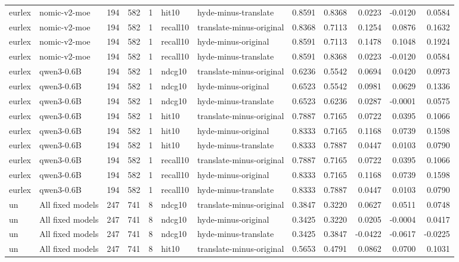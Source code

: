 \begin{tabular}{llrrrllrrrrr}
eurlex & nomic-v2-moe & 194 & 582 & 1 & hit10 & hyde-minus-translate & 0.8591 & 0.8368 & 0.0223 & -0.0120 & 0.0584 \\
eurlex & nomic-v2-moe & 194 & 582 & 1 & recall10 & translate-minus-original & 0.8368 & 0.7113 & 0.1254 & 0.0876 & 0.1632 \\
eurlex & nomic-v2-moe & 194 & 582 & 1 & recall10 & hyde-minus-original & 0.8591 & 0.7113 & 0.1478 & 0.1048 & 0.1924 \\
eurlex & nomic-v2-moe & 194 & 582 & 1 & recall10 & hyde-minus-translate & 0.8591 & 0.8368 & 0.0223 & -0.0120 & 0.0584 \\
eurlex & qwen3-0.6B & 194 & 582 & 1 & ndcg10 & translate-minus-original & 0.6236 & 0.5542 & 0.0694 & 0.0420 & 0.0973 \\
eurlex & qwen3-0.6B & 194 & 582 & 1 & ndcg10 & hyde-minus-original & 0.6523 & 0.5542 & 0.0981 & 0.0629 & 0.1336 \\
eurlex & qwen3-0.6B & 194 & 582 & 1 & ndcg10 & hyde-minus-translate & 0.6523 & 0.6236 & 0.0287 & -0.0001 & 0.0575 \\
eurlex & qwen3-0.6B & 194 & 582 & 1 & hit10 & translate-minus-original & 0.7887 & 0.7165 & 0.0722 & 0.0395 & 0.1066 \\
eurlex & qwen3-0.6B & 194 & 582 & 1 & hit10 & hyde-minus-original & 0.8333 & 0.7165 & 0.1168 & 0.0739 & 0.1598 \\
eurlex & qwen3-0.6B & 194 & 582 & 1 & hit10 & hyde-minus-translate & 0.8333 & 0.7887 & 0.0447 & 0.0103 & 0.0790 \\
eurlex & qwen3-0.6B & 194 & 582 & 1 & recall10 & translate-minus-original & 0.7887 & 0.7165 & 0.0722 & 0.0395 & 0.1066 \\
eurlex & qwen3-0.6B & 194 & 582 & 1 & recall10 & hyde-minus-original & 0.8333 & 0.7165 & 0.1168 & 0.0739 & 0.1598 \\
eurlex & qwen3-0.6B & 194 & 582 & 1 & recall10 & hyde-minus-translate & 0.8333 & 0.7887 & 0.0447 & 0.0103 & 0.0790 \\
un & All fixed models & 247 & 741 & 8 & ndcg10 & translate-minus-original & 0.3847 & 0.3220 & 0.0627 & 0.0511 & 0.0748 \\
un & All fixed models & 247 & 741 & 8 & ndcg10 & hyde-minus-original & 0.3425 & 0.3220 & 0.0205 & -0.0004 & 0.0417 \\
un & All fixed models & 247 & 741 & 8 & ndcg10 & hyde-minus-translate & 0.3425 & 0.3847 & -0.0422 & -0.0617 & -0.0225 \\
un & All fixed models & 247 & 741 & 8 & hit10 & translate-minus-original & 0.5653 & 0.4791 & 0.0862 & 0.0700 & 0.1031 \\

\end{tabular}
